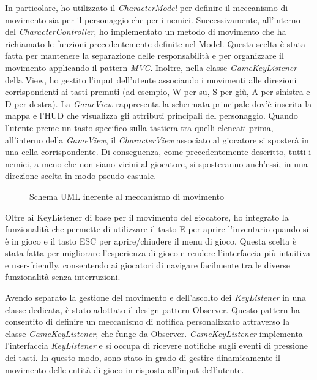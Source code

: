 \documentclass[a4paper,12pt]{report}
\begin{document}
In particolare, ho utilizzato il \textit{CharacterModel} per definire il meccanismo di movimento sia per il personaggio che per i nemici. Successivamente, all'interno del \textit{CharacterController}, ho implementato un metodo di movimento che ha richiamato le funzioni precedentemente definite nel Model. Questa scelta è stata fatta per mantenere la separazione delle responsabilità e per organizzare il movimento applicando il pattern \textit{MVC}. Inoltre, nella classe \textit{GameKeyListener} della View, ho gestito l'input dell'utente associando i movimenti alle direzioni corrispondenti ai tasti premuti (ad esempio, W per su, S per giù, A per sinistra e D per	destra). La \textit{GameView} rappresenta la schermata principale dov'è inserita la mappa e l'HUD che visualizza gli attributi principali del personaggio.
Quando l'utente preme un tasto specifico sulla tastiera tra quelli elencati prima, all'interno della \textit{GameView}, il \textit{CharacterView} associato al giocatore si sposterà in una cella corrispondente. Di conseguenza, come precedentemente descritto, tutti i nemici, a meno che non siano vicini al giocatore, si sposteranno anch'essi, in una direzione scelta in modo pseudo-casuale.

\begin{figure}[H]
	\centering
	
	\caption{Schema UML inerente al meccanismo di movimento}
	\label{fig:the-exiled-movement-uml}
\end{figure}

Oltre ai KeyListener di base per il movimento del giocatore, ho integrato la funzionalità che permette di utilizzare il tasto E per aprire l'inventario quando si è in gioco e il tasto ESC per aprire/chiudere il menu di gioco. Questa scelta è stata fatta per migliorare l'esperienza di gioco e rendere l'interfaccia più intuitiva e user-friendly, consentendo ai giocatori di navigare facilmente tra le diverse funzionalità senza interruzioni.

Avendo separato la gestione del movimento e dell'ascolto dei \textit{KeyListener} in una classe dedicata, è stato adottato il design pattern Observer. Questo pattern ha consentito di definire un meccanismo di notifica personalizzato attraverso la classe \textit{GameKeyListener}, che funge da Observer. \textit{GameKeyListener} implementa l'interfaccia \textit{KeyListener} e si occupa di ricevere notifiche sugli eventi di pressione dei tasti. In questo modo, sono stato in grado di gestire dinamicamente il movimento delle entità di gioco in risposta all'input dell'utente.
\end{document}
